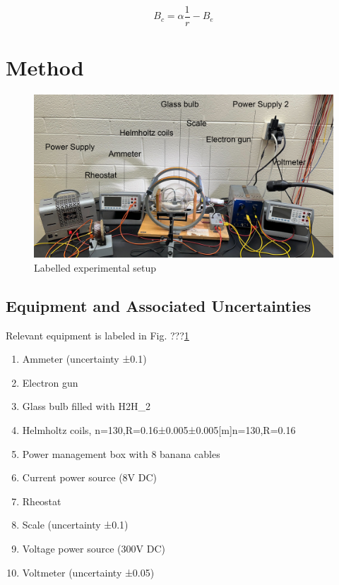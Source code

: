 \documentclass[12pt]{article}
\begin{document}
\begin{equation}
    B_c=\alpha\frac{1}{r}-B_e
\end{equation}

\section*{Method}
\begin{figure}[t!]
\centering
\includegraphics[width=0.65\columnwidth]{figure/aparatus.jpg}
\caption{Labelled experimental setup}
\label{fig:aparatus}
\end{figure}
\subsection*{Equipment and Associated Uncertainties}
Relevant equipment is labeled in Fig. ???\ref{fig:aparatus}
\begin{enumerate}
    \item Ammeter (uncertainty ±0.1) \autocite{manualkey}
    \item Electron gun
    \item Glass bulb filled with H2{\rm H_2}
    \item Helmholtz coils, n=130,R=0.16±0.005±0.005[m]n=130,\;R=0.16  \;[m]
    \item Power management box with 8 banana cables
    \item Current power source (8V DC)
    \item Rheostat
    \item Scale (uncertainty ±0.1)
    \item Voltage power source (300V DC)
    \item Voltmeter (uncertainty ±0.05) \autocite{manualkey}
\end{enumerate}
\end{document}
